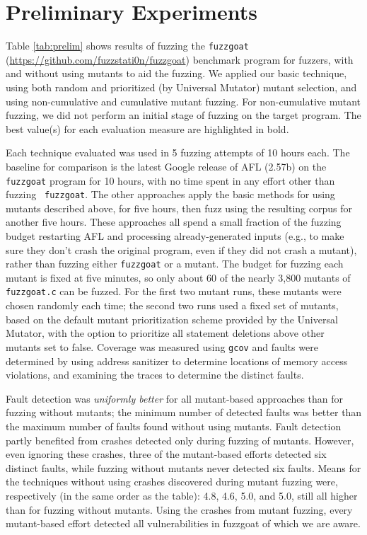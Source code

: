 \section{Preliminary Experiments}



Table \ref{tab:prelim} shows results of fuzzing the {\tt fuzzgoat}
(\url{https://github.com/fuzzstati0n/fuzzgoat}) benchmark program for
fuzzers, with and without using mutants to aid the fuzzing.  We
applied our basic technique, using both random and prioritized (by
Universal Mutator) mutant selection, and using non-cumulative and
cumulative mutant fuzzing.  For non-cumulative mutant fuzzing, we did
not perform an initial stage of fuzzing on the target program. The
best value(s) for each evaluation measure are highlighted in bold.


Each
technique evaluated was used in 5 fuzzing attempts of 10 hours each.  The
baseline for comparison is the latest Google release of  AFL (2.57b) on the {\tt fuzzgoat} program for 10
hours, with no time spent in any effort other than fuzzing {\tt
  fuzzgoat}.  The other approaches apply the basic methods for using
mutants described above, for five hours, then fuzz using the resulting
corpus for another five hours.  These approaches all spend a small
fraction of the fuzzing budget restarting AFL and processing
already-generated inputs (e.g., to make sure they don't crash the
original program, even if they did not crash a mutant), rather than
fuzzing either {\tt fuzzgoat} or a mutant.  The budget for fuzzing
each mutant is fixed at five minutes, so only about 60 of the nearly
3,800 mutants of {\tt fuzzgoat.c} can be fuzzed.  For the first two
mutant runs, these mutants were chosen randomly each time; the second
two runs used a fixed set of mutants, based on the default mutant
prioritization scheme provided by the Universal Mutator, with the option to
prioritize all statement deletions above other mutants set to false.  Coverage was measured using {\tt gcov} and faults were determined by using address sanitizer to determine locations of memory access violations, and examining the traces to determine the distinct faults.

Fault
detection was \emph{uniformly better} for all mutant-based approaches than
for fuzzing without mutants; the minimum number of detected faults was
better than the maximum number of faults found without using mutants.
Fault detection partly benefited from crashes detected only during fuzzing of mutants.
However, even ignoring these crashes, three of the mutant-based efforts detected six distinct faults, while fuzzing without mutants never detected six faults.  Means for the techniques without using crashes discovered during mutant fuzzing were, respectively (in the same order as the table): 4.8, 4.6, 5.0, and 5.0, still all higher than for fuzzing without mutants.  Using the crashes from mutant fuzzing, every mutant-based effort detected all vulnerabilities in fuzzgoat of which we are aware.


